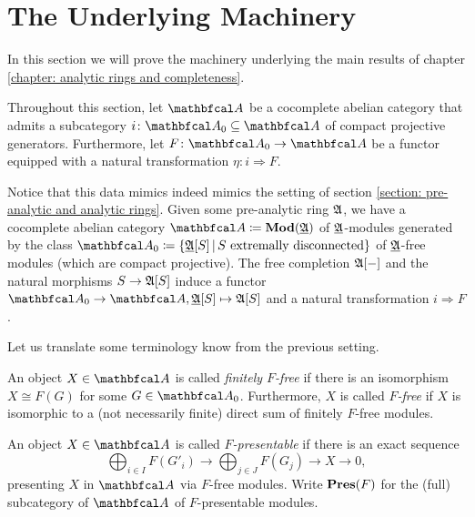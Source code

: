 
\section{The Underlying Machinery}
\label{section: the underlying machinery}

In this section we will prove the machinery underlying the main results of chapter \ref{chapter: analytic rings and completeness}. 
\begin{notation}
	Throughout this section, let $\category A$ be a cocomplete abelian category that admits a subcategory $i\colon \category A_0 \subseteq \category A$ of compact projective generators. Furthermore, let $F\colon \category A_0\to \category A$ be a functor equipped with a natural transformation $\eta\colon i\Rightarrow F$.
\end{notation}
Notice that this data mimics indeed mimics the setting of section \ref{section: pre-analytic and analytic rings}. Given some pre-analytic ring ${\mathfrak{A}}$, we have a cocomplete abelian category $\category A\ldef\mod{\underlying{A}}$ of ${\underline{{\mathfrak{A}}}}$-modules generated by the class $\category A_0\ldef \{\free {\underlying{A}} S\setseparator S\text{ extremally disconnected}\}$ of ${\underline{{\mathfrak{A}}}}$-free modules (which are compact projective). The free completion ${{{\mathfrak{A}}[-]}}$ and the natural morphisms $S\to {{{\mathfrak{A}}[S]}}$ induce a functor $\category A_0\to \category A, \free{\underlying{A}}S\mapsto \pfree A S$ and a natural transformation $i\Rightarrow F$.

Let us translate some terminology know from the previous setting.
\begin{definition}[$F$-Freeness]
	An object $X\in\category A$ is called \emph{finitely $F$-free} if there is an isomorphism $X\cong F(G)$ for some $G\in\category A_0$. Furthermore, $X$ is called \emph{$F$-free} if $X$ is isomorphic to a (not necessarily finite) direct sum of finitely $F$-free modules.
\end{definition}

\begin{definition}[$F$-Presentability]
	An object $X\in\category A$ is called \emph{$F$-presentable} if there is an exact sequence
	$$\bigoplus_{i\in I} F(G'_i) \to \bigoplus_{j\in J} F(G_j)\to X\to 0,$$
	presenting $X$ in $\category A$ via $F$-free modules. Write ${{\mathbf{Pres}}(F)}$ for the (full) subcategory of $\category A$ of $F$-presentable modules.
\end{definition}

